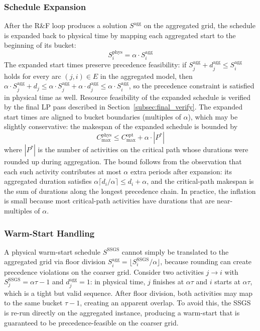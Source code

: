\subsubsection*{Schedule Expansion}

After the R\&F loop produces a solution $S^{\mathrm{agg}}$ on
the aggregated grid, the schedule is expanded back to physical
time by mapping each aggregated start to the beginning of its
bucket:
\begin{equation}
    S_i^{\mathrm{phys}} = \alpha \cdot S_i^{\mathrm{agg}}
    \label{eq:expand}
\end{equation}
The expanded start times preserve precedence feasibility:
if $S_j^{\mathrm{agg}} + d_j^{\mathrm{agg}} \leq
S_i^{\mathrm{agg}}$ holds for every arc $(j, i) \in E$ in the
aggregated model, then $\alpha \cdot S_j^{\mathrm{agg}} +
d_j \leq \alpha \cdot S_j^{\mathrm{agg}} +
\alpha \cdot d_j^{\mathrm{agg}} \leq \alpha \cdot
S_i^{\mathrm{agg}}$, so the precedence constraint is satisfied
in physical time as well. Resource feasibility of the expanded
schedule is verified by the final LP pass described in
Section~\ref{subsec:final_verify}. The expanded start times
are aligned to bucket boundaries (multiples of $\alpha$), which
may be slightly conservative: the makespan of the expanded
schedule is bounded by
\begin{equation}
    C_{\max}^{\mathrm{phys}} \leq
    C_{\max}^{\mathrm{opt}} + \alpha \cdot |P^*|
    \label{eq:makespan_bound}
\end{equation}
where $|P^*|$ is the number of activities on the critical path
whose durations were rounded up during aggregation. The bound follows from the observation that each such activity
contributes at most $\alpha$ extra periods after expansion: its
aggregated duration satisfies
$\alpha \lceil d_i / \alpha \rceil \leq d_i + \alpha$, and the
critical-path makespan is the sum of durations along the longest
precedence chain. In practice, the inflation is small because
most critical-path activities have durations that are
near-multiples of $\alpha$.

\subsubsection*{Warm-Start Handling}

A physical warm-start schedule $S^{\mathrm{SSGS}}$ cannot simply
be translated to the aggregated grid via floor division
$S_i^{\mathrm{agg}} = \lfloor S_i^{\mathrm{SSGS}} / \alpha
\rfloor$, because rounding can create precedence violations on the
coarser grid. Consider two activities $j \to i$ with
$S_j^{\mathrm{SSGS}} = \alpha\tau - 1$ and
$d_j^{\mathrm{agg}} = 1$: in physical time, $j$ finishes at
$\alpha\tau$ and $i$ starts at $\alpha\tau$, which is a tight but valid
sequence. After floor division, both activities may map to the
same bucket $\tau - 1$, creating an apparent overlap. To avoid
this, the SSGS is re-run directly on the aggregated instance,
producing a warm-start that is guaranteed to be
precedence-feasible on the coarser grid.

